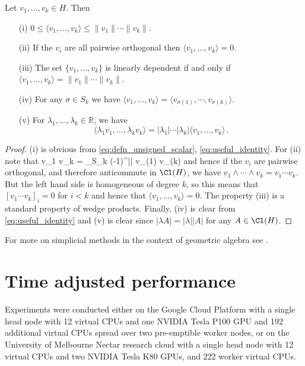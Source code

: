 \documentclass{article} %
\begin{document}
\begin{lemma}\label{lemma:proof_atte_prop} Let $v_1,\ldots,v_k \in H$. Then
\begin{itemize}
\item[(i)] $0 \le \langle v_1, \ldots, v_k \rangle \le \| v_1 \| \cdots \| v_k \|$.
\item[(ii)] If the $v_i$ are all pairwise orthogonal then $\langle v_1, \ldots, v_k \rangle = 0$.
\item[(iii)] The set $\{ v_1, \ldots, v_k \}$ is linearly dependent if and only if $\langle v_1, \ldots, v_k \rangle = \| v_1 \| \cdots \| v_k \|$.
\item[(iv)] For any $\sigma \in S_k$ we have $\langle v_1, \ldots, v_k \rangle = \langle v_{\sigma(1)}, \cdots, v_{\sigma(k)} \rangle$.
\item[(v)] For $\lambda_1,\ldots,\lambda_k \in \mathbb{R}$, we have
\[
\langle \lambda_1 v_1, \ldots, \lambda_k v_k \rangle = | \lambda_1 | \cdots | \lambda_k | \langle v_1, \ldots, v_k \rangle\,.
\]
\end{itemize}
\end{lemma}
\begin{proof}
(i) is obvious from \eqref{eq:defn_unsigned_scalar}, \eqref{eq:useful_identity}. For (ii) note that
\be
v_1 \wedge \cdots \wedge v_k =  \sum_{\sigma \in S_k} (-1)^{|\sigma|} v_{\sigma(1)} \cdots v_{\sigma(k)}
\ee
and hence if the $v_i$ are pairwise orthogonal, and therefore anticommute in $\Cl(H)$, we have $v_1 \wedge \cdots \wedge v_k = v_1 \cdots v_k$. But the left hand side is homogeneous of degree $k$, so this means that $[v_1 \cdots v_k]_i = 0$ for $i < k$ and hence that $\langle v_1, \ldots, v_k \rangle = 0$. The property (iii) is a standard property of wedge products. Finally, (iv) is clear from \eqref{eq:useful_identity} and (v) is clear since $| \lambda A | = |\lambda| |A|$ for any $A \in \Cl(H)$.
\end{proof}

For more on simplicial methods in the context of geometric algebra see \citep{sobczyk,beware}.


\section{Time adjusted performance}
\label{appendix:time_adjusted}

Experiments were conducted either on the Google Cloud Platform with a single head node with 12 virtual CPUs and one NVIDIA Tesla P100 GPU and 192 additional virtual CPUs spread over two pre-emptible worker nodes, or on the University of Melbourne Nectar research cloud with a single head node with 12 virtual CPUs and two NVIDIA Tesla K80 GPUs, and 222 worker virtual CPUs.
\end{document}

